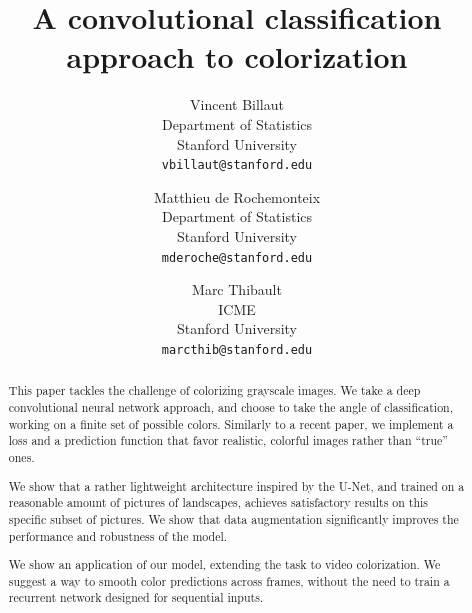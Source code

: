 \documentclass[10pt,twocolumn,letterpaper]{article}
\begin{document}
\title{A convolutional classification approach to colorization}

\author{Vincent Billaut\\
Department of Statistics\\
Stanford University\\
{\tt\small vbillaut@stanford.edu}
\and
Matthieu de Rochemonteix\\
Department of Statistics\\
Stanford University\\
{\tt\small mderoche@stanford.edu}
\and
Marc Thibault\\
ICME\\
Stanford University\\
{\tt\small marcthib@stanford.edu}
}

\maketitle



\begin{abstract}
This paper tackles the challenge of colorizing grayscale images. We take a deep convolutional neural network approach, and choose to take the angle of classification, working on a finite set of possible colors. Similarly to a recent paper, we implement a loss and a prediction function that favor realistic, colorful images rather than ``true'' ones.

We show that a rather lightweight architecture inspired by the U-Net, and trained on a reasonable amount of pictures of landscapes, achieves satisfactory results on this specific subset of pictures. We show that data augmentation significantly improves the performance and robustness of the model.

We show an application of our model, extending the task to video colorization. We suggest a way to smooth color predictions across frames, without the need to train a recurrent network designed for sequential inputs.

\end{abstract}
\end{document}
